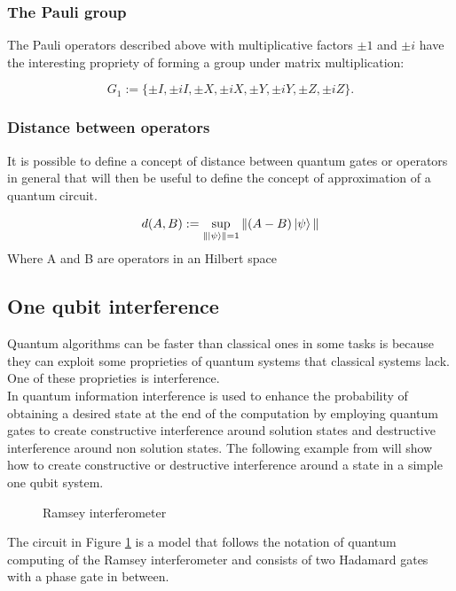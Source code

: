 \documentclass{article}
\begin{document}
\subsubsection{The Pauli group}
The Pauli operators described above with multiplicative factors $\pm 1$ and $\pm i$ have the
interesting propriety of forming a group under matrix multiplication:

\begin{equation}
	G_1 := \{\pm I, \pm iI, \pm X, \pm iX, \pm Y, \pm iY, \pm Z, \pm iZ\}.
	\label{pauligrup}
\end{equation}


\subsubsection{Distance between operators}
It is possible to define a concept of distance between quantum gates or operators
in general that will then be useful to define the concept of approximation of a
quantum circuit.

\begin{equation}
	d(A,B) := \sup_{\| \ket{\psi}\|=1} \|(A-B)\ket{\psi}\|
	\label{distance}
\end{equation}
Where A and B are operators in an Hilbert space

\subsection{One qubit interference}


Quantum algorithms can be faster than classical ones
in some tasks is because they can exploit some proprieties of quantum
systems that classical systems lack.
One of these proprieties is interference.\\
In quantum information interference is used to enhance the probability of
obtaining a desired state at the end of the computation by employing quantum gates
to create constructive interference around solution states and destructive
interference around non solution states.
The following example from \cite{ekert_quantum_information_2020} will show how to create
constructive or destructive interference around a state in a simple one qubit system.
\vspace{10pt}
\begin{figure}[H]
	\centering
	\caption{Ramsey interferometer}
	\label{interference}
\end{figure}
\vspace{10pt}
\noindent The circuit in Figure \ref{interference} is a model
that follows the notation of quantum computing of the Ramsey interferometer and consists of
two Hadamard gates with a phase gate in between.\\
\end{document}
